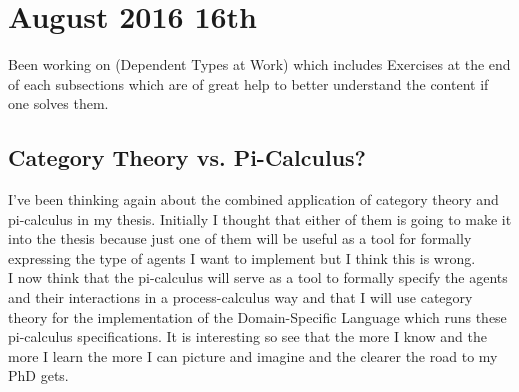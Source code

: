 \section*{August 2016 16th}
Been working on \cite{Bove2009} (Dependent Types at Work) which includes Exercises at the end of each subsections which are of great help to better understand the content if one solves them.

\subsection*{Category Theory vs. Pi-Calculus?}
I've been thinking again about the combined application of category theory and pi-calculus in my thesis. Initially I thought that either of them is going to make it into the thesis because just one of them will be useful as a tool for formally expressing the type of agents I want to implement but I think this is wrong. \\
I now think that the pi-calculus will serve as a tool to formally specify the agents and their interactions in a process-calculus way and that I will use category theory for the implementation of the Domain-Specific Language which runs these pi-calculus specifications.
\medskip
It is interesting so see that the more I know and the more I learn the more I can picture and imagine and the clearer the road to my PhD gets.

